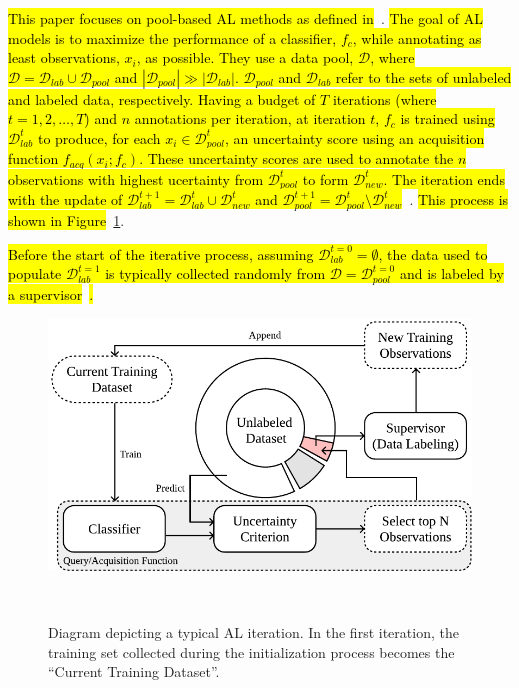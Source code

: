 \documentclass[preprint, 12pt]{elsarticle}
\begin{document}
\hl{This paper focuses on pool-based AL methods as defined
in}~\cite{katz2021improved}. \hl{The goal of AL models is to maximize the
performance of a classifier, $f_{c}$,  while annotating as least
observations, $x_i$, as possible. They use a data pool, $\mathcal{D}$, where
$\mathcal{D} = \mathcal{D}_{lab} \cup \mathcal{D}_{pool}$ and
$|\mathcal{D}_{pool}| \gg |\mathcal{D}_{lab}|$.  $\mathcal{D}_{pool}$ and
$\mathcal{D}_{lab}$ refer to the sets of unlabeled and labeled data,
respectively.  Having a budget of $T$ iterations (where $t = 1, 2, \ldots, T$)
and $n$ annotations per iteration, at iteration $t$, $f_c$ is trained using
$\mathcal{D}_{lab}^t$ to produce, for each $x_i \in \mathcal{D}_{pool}^t$, an
uncertainty score using an acquisition function $f_{acq}(x_i;f_c)$. These
uncertainty scores are used to annotate the $n$
observations with highest ucertainty from $\mathcal{D}_{pool}^t$ to form
$\mathcal{D}_{new}^t$. The iteration ends with the update of
$\mathcal{D}_{lab}^{t+1} = \mathcal{D}_{lab}^t \cup \mathcal{D}_{new}^t$ and
$\mathcal{D}_{pool}^{t+1} = \mathcal{D}_{pool}^t \setminus
\mathcal{D}_{new}^t$}~\cite{Su2020, Sverchkov2017}. \hl{This
process is shown in Figure}~\ref{fig:al_iteration}.

\hl{Before the start of the iterative process, assuming 
$\mathcal{D}_{lab}^{t=0} = \emptyset$, the data used to populate
$\mathcal{D}_{lab}^{t=1}$ is typically collected randomly from
$\mathcal{D} = \mathcal{D}_{pool}^{t=0}$ and is labeled by a
supervisor}~\cite{Fonseca2021, Yoo2019, Aghdam2019}\hl{.} 

\begin{figure}[H]
	\centering
	\includegraphics[width=.75\linewidth]{../analysis/al_iteration}
    \caption{%
        Diagram depicting a typical AL iteration. In the first iteration, the
        training set collected during the initialization process becomes the
        ``Current Training Dataset''.
    }~\label{fig:al_iteration}
\end{figure}
\end{document}
